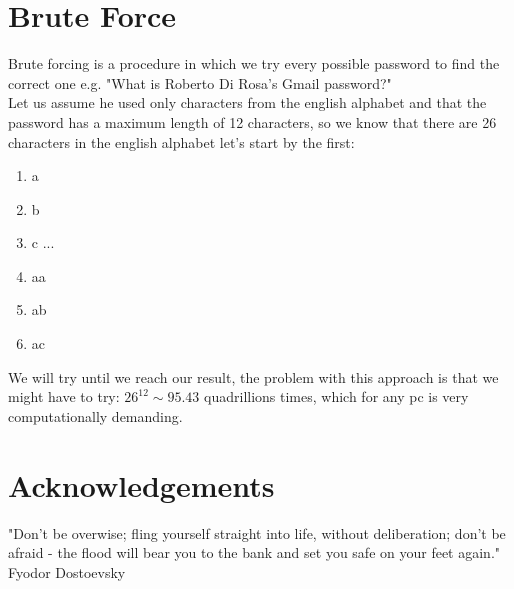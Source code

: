 \documentclass[english,noexaminfo,a4paper,oneside, binding = 0.6cm]{sapthesis}
\begin{document}
\section{Brute Force}
\label{bruteforce}
Brute forcing is a procedure in which we try every possible password to find the correct one e.g.  "What is Roberto Di Rosa's Gmail password?" \\ 
Let us assume he used only characters from the english alphabet and that the password has a maximum length of 12 characters, so we know that there are 26 characters in the english alphabet let's start by the first:
 \begin{enumerate}
  \item a
  \item b
  \item c
    ...
  \item aa
  \item ab
  \item ac
 \end{enumerate}

We will try until we reach our result, the problem with this approach is that we might have to try:  
$26^{ 12 } \sim 95.43$ quadrillions times, which for any pc is very computationally demanding.
\section{Acknowledgements}
"Don’t be overwise; fling yourself straight into life, without deliberation; don’t be afraid - the flood will bear you to the bank and set you safe on your feet again." Fyodor Dostoevsky


\backmatter
{}
 


\end{document}
